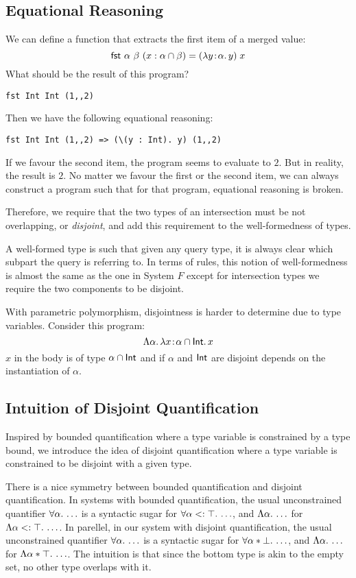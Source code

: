 \subsection{Equational Reasoning}

We can define a  function that extracts the first item of a merged value:
\[
\textsf{fst} \ \alpha \ \beta \ (x : \alpha \cap \beta) = (\lambda y \!:\! \alpha.\, y) \; x
\]
What should be the result of this program?
\begin{lstlisting}
fst Int Int (1,,2)
\end{lstlisting}

Then we have the following equational reasoning:
\begin{lstlisting}
fst Int Int (1,,2) => (\(y : Int). y) (1,,2)
\end{lstlisting}
If we favour the second item, the program seems to evaluate to $2$. But in
reality, the result is $2$. No matter we favour the first or the second item,
we can always construct a program such that for that program, equational
reasoning is broken.

Therefore, we require that the two types of an intersection must be not
overlapping, or \emph{disjoint}, and add this requirement to the well-formedness of types.

A well-formed type is such that given any query type,
it is always clear which subpart the query is referring to.
In terms of rules, this notion of well-formedness is almost the same as the one in System $F$
except for intersection types we require the two components to be disjoint.

With parametric polymorphism, disjointness is harder to determine due to type variables.
Consider this program:
\[
\Lambda \alpha.\, \lambda x \!:\! \alpha \cap \textsf{Int}.\, x
\]
$x$ in the body is of type $\alpha \cap \textsf{Int}$ and if $\alpha$ and $\textsf{Int}$ are
disjoint depends on the instantiation of $\alpha$.

\subsection{Intuition of Disjoint Quantification}

Inspired by bounded quantification where a type variable is constrained by a type bound,
we introduce the idea of disjoint quantification where a type variable is constrained
to be disjoint with a given type.

There is a nice symmetry between bounded quantification and disjoint quantification.
In systems with bounded quantification,
the usual unconstrained quantifier $\forall \alpha.\, \ldots$
is a syntactic sugar for $\forall \alpha <: \top.\, \ldots$, and
$\Lambda \alpha.\, \ldots$ for $\Lambda \alpha <: \top.\, \ldots$.
In parellel, in our system with disjoint quantification,
the usual unconstrained quantifier $\forall \alpha.\, \ldots$
is a syntactic sugar for $\forall \alpha * \bot.\, \ldots$, and
$\Lambda \alpha.\, \ldots$ for $\Lambda \alpha * \top.\, \ldots$.
The intuition is that since the bottom type is akin to the empty set,
no other type overlaps with it.

